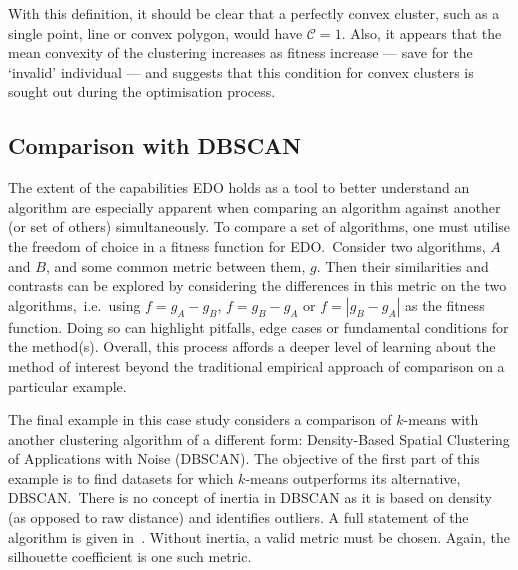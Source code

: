 With this definition, it should be clear that a perfectly convex cluster, such
as a single point, line or convex polygon, would have \(\mathcal{C} = 1\). Also,
it appears that the mean convexity of the clustering increases as fitness
increase --- save for the `invalid' individual --- and suggests that this
condition for convex clusters is sought out during the optimisation process.


\subsection{Comparison with DBSCAN}\label{subsec:dbscan}

The extent of the capabilities EDO holds as a tool to better understand an
algorithm are especially apparent when comparing an algorithm against another
(or set of others) simultaneously. To compare a set of algorithms, one must
utilise the freedom of choice in a fitness function for EDO.\ Consider two
algorithms, \(A\) and \(B\), and some common metric between them, \(g\). Then
their similarities and contrasts can be explored by considering the differences
in this metric on the two algorithms,~i.e.\ using \(f=g_A-g_B\), \(f=g_B-g_A\)
or \(f=\left|g_B-g_A\right|\) as the fitness function. Doing so can highlight
pitfalls, edge cases or fundamental conditions for the method(s). Overall, this
process affords a deeper level of learning about the method of interest beyond
the traditional empirical approach of comparison on a particular example.

The final example in this case study considers a comparison of \(k\)-means with
another clustering algorithm of a different form: Density-Based Spatial
Clustering of Applications with Noise (DBSCAN). The objective of the first part
of this example is to find datasets for which \(k\)-means outperforms its
alternative, DBSCAN.\ There is no concept of inertia in DBSCAN as it is based on
density (as opposed to raw distance) and identifies outliers. A full statement
of the algorithm is given in~\cite{Ester1996}. Without inertia, a valid metric
must be chosen. Again, the silhouette coefficient is one such metric.

